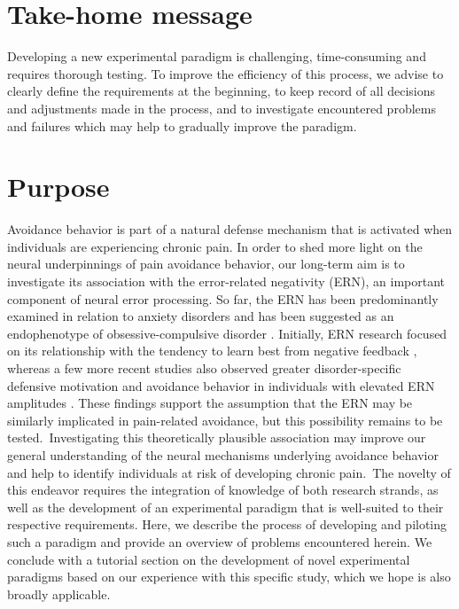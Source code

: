 \documentclass[twocolumn, serif, authordate, empirical]{jote-article}
\begin{document}


 {}\section*{Take-home message} 

Developing a new experimental paradigm is challenging, time-consuming and requires thorough testing. To improve the efficiency of this process, we advise to clearly define the requirements at the beginning, to keep record of all decisions and adjustments made in the process, and to investigate encountered problems and failures which may help to gradually improve the paradigm.


 {}\section*{Purpose} 

Avoidance behavior is part of a natural defense mechanism that is activated when individuals are experiencing chronic pain. In order to shed more light on the neural underpinnings of pain avoidance behavior, our long-term aim is to investigate its association with the error-related negativity (ERN), an important component of neural error processing. So far, the ERN has been predominantly examined in relation to anxiety disorders and has been suggested as an endophenotype of obsessive-compulsive disorder \parencite{Riesel2011}. Initially, ERN research focused on its relationship with the tendency to learn best from negative feedback \parencite{Frank2005}, whereas a few more recent studies also observed greater disorder-specific defensive motivation and avoidance behavior in individuals with elevated ERN amplitudes \parencite{Riesel2019, Riesel2019b, Weinberg2016}. These findings support the assumption that the ERN may be similarly implicated in pain-related avoidance, but this possibility remains to be tested.~Investigating this theoretically plausible association may improve our general understanding of the neural mechanisms underlying avoidance behavior and help to identify individuals at risk of developing chronic pain.~The novelty of this endeavor requires the integration of knowledge of both research strands, as well as the development of an experimental paradigm that is well-suited to their respective requirements. Here, we describe the process of developing and piloting such a paradigm and provide an overview of problems encountered herein. We conclude with a tutorial section on the development of novel experimental paradigms based on our experience with this specific study, which we hope is also broadly applicable.
\end{document}
